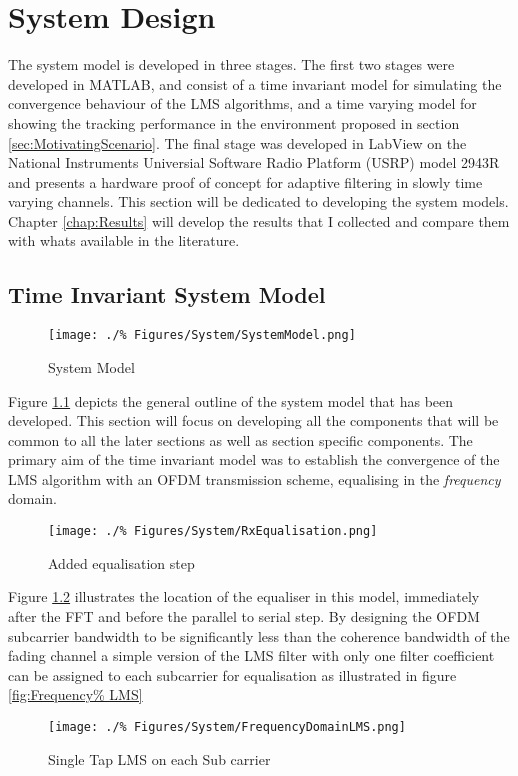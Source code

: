 \chapter{System Design}
\label{chap:System}
The system model is developed in three stages. %
The first two stages were developed in MATLAB, %
and consist of a time invariant model %
for simulating the convergence behaviour of %
the LMS algorithms, and a time varying %
model for showing the tracking performance %
in the environment proposed in section %
\ref{sec:MotivatingScenario}. The %
final stage was developed in LabView on the %
National Instruments Universial Software Radio %
Platform (USRP) model 2943R and presents %
a hardware proof of concept for adaptive %
filtering in slowly time varying channels. %
This section will be dedicated to developing %
the system models. Chapter \ref{chap:Results} %
will develop the results that I collected %
and compare them with whats available in the %
literature.

\section{Time Invariant System Model}
\label{sec:TIModel}
\FloatBarrier
\begin{figure}[ht]
	\texttt{[image: ./\%
	Figures/System/SystemModel.png]}
	\caption{System Model}
	\label{fig:SysModel}
\end{figure}
Figure \ref{fig:SysModel} depicts the general %
outline of the system model that has been %
developed. This section will focus on %
developing all the components that will %
be common to all the later sections as %
well as section specific components.
\FloatBarrier
The primary aim of the time invariant %
model was to establish the convergence %
of the LMS algorithm with an OFDM %
transmission scheme, equalising in the %
\emph{frequency} domain.
\begin{figure}[ht]
	\texttt{[image: ./\%
	Figures/System/RxEqualisation.png]}
	\caption{Added equalisation step}
	\label{fig:RxEqualiser}
\end{figure}
Figure \ref{fig:RxEqualiser} illustrates %
the location of the equaliser in this model, %
immediately after the FFT and before the %
parallel to serial step. By designing %
the OFDM subcarrier bandwidth to be %
significantly less than the coherence %
bandwidth of the fading channel a simple %
version of the LMS filter with only one %
filter coefficient can be assigned to %
each subcarrier for equalisation as %
illustrated in figure \ref{fig:Frequency%
LMS}
\FloatBarrier
\begin{figure}[ht]
	\centering
	\texttt{[image: ./\%
	Figures/System/FrequencyDomainLMS.png]}
	\caption{Single Tap LMS on each Sub%
	carrier}
	\label{fig:FrequencyLMS}
\end{figure}
\FloatBarrier
